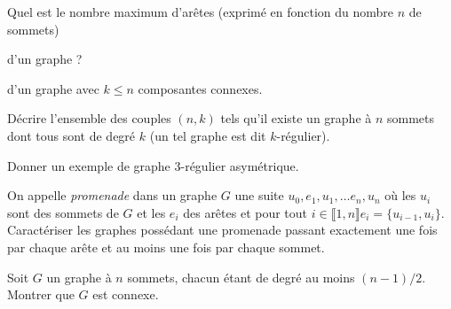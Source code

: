 \documentclass[french]{report}
\begin{document}
\begin{exo}
    Quel est le nombre maximum d'arêtes (exprimé en fonction du nombre \(n\) de sommets)
    \begin{q}{1}
        d'un graphe ?
    \end{q}
    \begin{q}{2}
        d'un graphe avec \(k\leq n\) composantes connexes.
    \end{q}
\end{exo}

\begin{exo}
    Décrire l'ensemble des couples \(\left(n,k\right)\) tels qu'il existe un graphe
    à \(n\) sommets dont tous sont de degré \(k\) (un tel graphe est dit \(k\)-régulier).
\end{exo}

\begin{exo}
    Donner un exemple de graphe \(3\)-régulier asymétrique.
\end{exo}

\begin{exo}
    On appelle \textit{promenade} dans un graphe \(G\) une suite \(u_0, e_1, u_1,\dots
    e_n,u_n\) où les \(u_i\) sont des sommets de \(G\) et les \(e_i\) des arêtes et
    pour tout \(i\in\llbracket1,n\rrbracket e_i=\{u_{i-1},u_i\}\). Caractériser les
    graphes possédant une promenade passant exactement une fois par chaque arête et
    au moins une fois par chaque sommet.
\end{exo}

\begin{exo}
    Soit \(G\) un graphe à \(n\) sommets, chacun étant de degré au moins
    \(\left(n-1\right)/2\). Montrer que \(G\) est connexe.
\end{exo}
\end{document}

